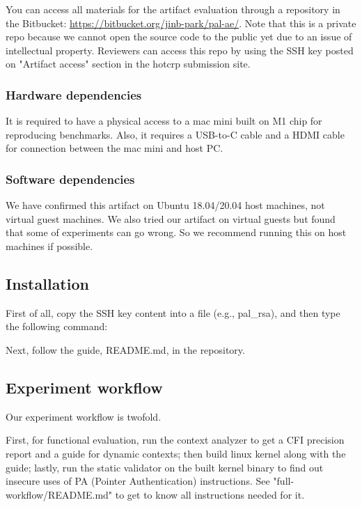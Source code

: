 \documentclass[letterpaper,twocolumn,10pt]{article}
\begin{document}
{You can access all materials for the artifact evaluation through a repository in the Bitbucket:
\url{https://bitbucket.org/jinb-park/pal-ae/}.
Note that this is a private repo because we cannot open the source code to the public yet due to an issue of intellectual property.
Reviewers can access this repo by using the SSH key posted on "Artifact access" section in the hotcrp submission site.

\subsubsection{Hardware dependencies}

It is required to have a physical access to a mac mini built on M1 chip for reproducing benchmarks.
Also, it requires a USB-to-C cable and a HDMI cable for connection between the mac mini and host PC.

\subsubsection{Software dependencies}

We have confirmed this artifact on Ubuntu 18.04/20.04 host machines, not virtual guest machines.
We also tried our artifact on virtual guests but found that some of experiments can go wrong.
So we recommend running this on host machines if possible.

\subsection{Installation}

First of all, copy the SSH key content into a file (e.g., pal\_rsa), and then type the following command:


Next, follow the guide, README.md, in the repository.

\subsection{Experiment workflow}

Our experiment workflow is twofold.

\noindent First, for functional evaluation, run the context analyzer to get a CFI precision report and a guide for dynamic contexts;
then build linux kernel along with the guide; lastly, run the static validator on the built kernel binary to find out insecure uses of PA (Pointer Authentication) instructions.
See "full-workflow/README.md" to get to know all instructions needed for it.

}
\end{document}
